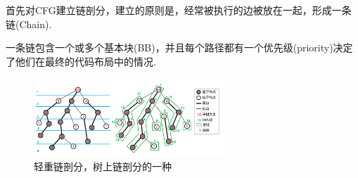 首先对CFG建立链剖分，建立的原则是，经常被执行的边被放在一起，形成一条链(Chain).

一条链包含一个或多个基本块(BB)，并且每个路径都有一个优先级(priority)决定了他们在最终的代码布局中的情况.

\begin{figure}[H]
    \centering
    \includegraphics[width=0.64\textwidth]{images/hld.png}
    \caption{\cite{unknown-author-2022}轻重链剖分，树上链剖分的一种}
\end{figure}